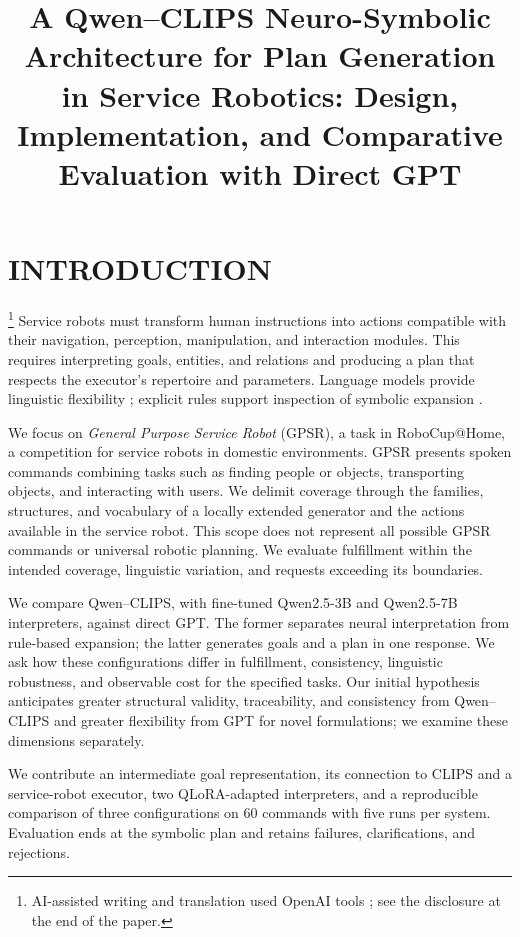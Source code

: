 \documentclass[a4paper,twoside]{article}
\title{A Qwen--CLIPS Neuro-Symbolic Architecture for Plan Generation in Service Robotics: Design, Implementation, and Comparative Evaluation with Direct GPT}
\author{}
\begin{document}
\maketitle

\section{INTRODUCTION}\footnote{AI-assisted writing and translation used OpenAI tools \cite{openai_assistance}; see the disclosure at the end of the paper.}
Service robots must transform human instructions into actions compatible with their navigation, perception, manipulation, and interaction modules. This requires interpreting goals, entities, and relations and producing a plan that respects the executor's repertoire and parameters. Language models provide linguistic flexibility \cite{Vaswani2017,Shi2023}; explicit rules support inspection of symbolic expansion \cite{NASA_CLIPS,Giarratano2005}.

We focus on \emph{General Purpose Service Robot} (GPSR), a task in RoboCup@Home, a competition for service robots in domestic environments. GPSR presents spoken commands combining tasks such as finding people or objects, transporting objects, and interacting with users. We delimit coverage through the families, structures, and vocabulary of a locally extended generator and the actions available in the service robot. This scope does not represent all possible GPSR commands or universal robotic planning. We evaluate fulfillment within the intended coverage, linguistic variation, and requests exceeding its boundaries.

We compare Qwen--CLIPS, with fine-tuned Qwen2.5-3B and Qwen2.5-7B interpreters, against direct GPT. The former separates neural interpretation from rule-based expansion; the latter generates goals and a plan in one response. We ask how these configurations differ in fulfillment, consistency, linguistic robustness, and observable cost for the specified tasks. Our initial hypothesis anticipates greater structural validity, traceability, and consistency from Qwen--CLIPS and greater flexibility from GPT for novel formulations; we examine these dimensions separately.

We contribute an intermediate goal representation, its connection to CLIPS and a service-robot executor, two QLoRA-adapted interpreters, and a reproducible comparison of three configurations on 60 commands with five runs per system. Evaluation ends at the symbolic plan and retains failures, clarifications, and rejections.
\end{document}
